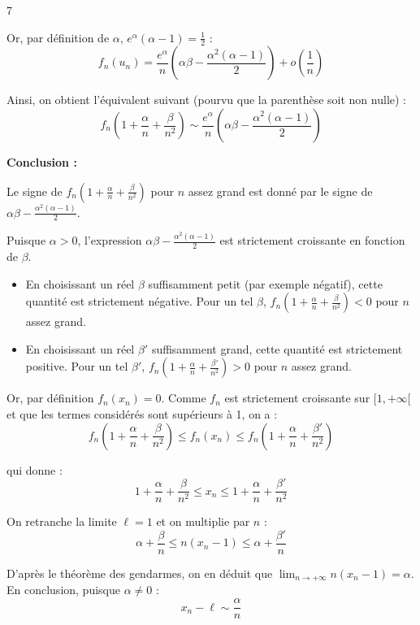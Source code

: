 \begin{correction}{7}
\begin{enumerate}
    Or, par définition de $\alpha$, $e^\alpha(\alpha - 1) = \frac{1}{2}$ :
    \[f_n(u_n) = \frac{e^\alpha}{n} \left( \alpha\beta - \frac{\alpha^2(\alpha - 1)}{2} \right) + o\left(\frac{1}{n}\right)\]

    Ainsi, on obtient l'équivalent suivant (pourvu que la parenthèse soit non nulle) :
    \[f_n\left(1 + \frac{\alpha}{n} + \frac{\beta}{n^2}\right) \sim \frac{e^\alpha}{n} \left( \alpha\beta - \frac{\alpha^2(\alpha - 1)}{2} \right)\]
    
    \textbf{Conclusion :}

    Le signe de $f_n\left(1 + \frac{\alpha}{n} + \frac{\beta}{n^2}\right)$ pour $n$ assez grand est donné par le signe de $\alpha\beta - \frac{\alpha^2(\alpha - 1)}{2}$.

    Puisque $\alpha > 0$, l'expression $\alpha\beta - \frac{\alpha^2(\alpha - 1)}{2}$ est strictement croissante en fonction de $\beta$.
    \begin{itemize}
        \item En choisissant un réel $\beta$ suffisamment petit (par exemple négatif), cette quantité est strictement négative. Pour un tel $\beta$, $f_n\left(1 + \frac{\alpha}{n} + \frac{\beta}{n^2}\right) < 0$ pour $n$ assez grand.
        \item En choisissant un réel $\beta'$ suffisamment grand, cette quantité est strictement positive. Pour un tel $\beta'$, $f_n\left(1 + \frac{\alpha}{n} + \frac{\beta'}{n^2}\right) > 0$ pour $n$ assez grand.
    \end{itemize}

    Or, par définition $f_n(x_n) = 0$. Comme $f_n$ est strictement croissante sur $[1, +\infty[$ et que les termes considérés sont supérieurs à 1, on a :
    \[f_n\left(1 + \frac{\alpha}{n} + \frac{\beta}{n^2}\right) \leqslant f_n(x_n) \leqslant f_n\left(1 + \frac{\alpha}{n} + \frac{\beta'}{n^2}\right)\]

    qui donne :
    \[1 + \frac{\alpha}{n} + \frac{\beta}{n^2} \leqslant x_n \leqslant 1 + \frac{\alpha}{n} + \frac{\beta'}{n^2}\]

    On retranche la limite $\ell = 1$ et on multiplie par $n$ :
    \[\alpha + \frac{\beta}{n} \leqslant n(x_n - 1) \leqslant \alpha + \frac{\beta'}{n}\]

    D'après le théorème des gendarmes, on en déduit que $\lim_{n \to +\infty} n(x_n - 1) = \alpha$.
    En conclusion, puisque $\alpha \neq 0$ :
    \[x_n - \ell \sim \frac{\alpha}{n}\]
\end{enumerate}
\end{correction}

